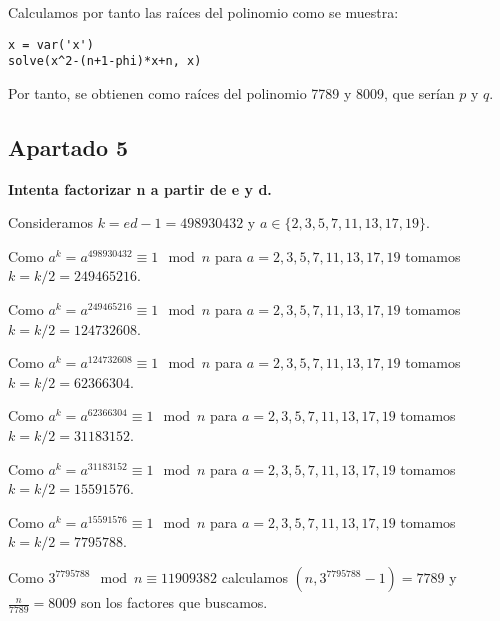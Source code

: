 \documentclass[a4paper]{article}
\begin{document}
Calculamos por tanto las raíces del polinomio como se muestra:

\begin{verbatim}
x = var('x')
solve(x^2-(n+1-phi)*x+n, x)
\end{verbatim}

Por tanto, se obtienen como raíces del polinomio 7789 y 8009, que serían $p$ y $q$.

\subsection{Apartado 5}
\textbf{Intenta factorizar n a partir de e y d.}

Consideramos $k=ed-1=498930432$ y $a \in \{2, 3, 5, 7, 11, 13, 17, 19 \}$.

Como $a^k = a^{498930432} \equiv 1 \mod n$ para $a=2,3,5,7,11,13,17,19$ tomamos $k=k/2 = 249465216$.

Como $a^k = a^{249465216} \equiv 1 \mod n$ para $a=2,3,5,7,11,13,17,19$ tomamos $k=k/2 = 124732608$.

Como $a^k = a^{124732608} \equiv 1 \mod n$ para $a=2,3,5,7,11,13,17,19$ tomamos $k=k/2 = 62366304$.

Como $a^k = a^{62366304} \equiv 1 \mod n$ para $a=2,3,5,7,11,13,17,19$ tomamos $k=k/2 = 31183152$.

Como $a^k = a^{31183152} \equiv 1 \mod n$ para $a=2,3,5,7,11,13,17,19$ tomamos $k=k/2 = 15591576$.

Como $a^k = a^{15591576} \equiv 1 \mod n$ para $a=2,3,5,7,11,13,17,19$ tomamos $k=k/2 = 7795788$.

Como $3^{7795788} \mod n \equiv 11909382$ calculamos $(n,3^{7795788}-1)=7789$ y $\frac{n}{7789}=8009$ son los factores que buscamos.
\end{document}
